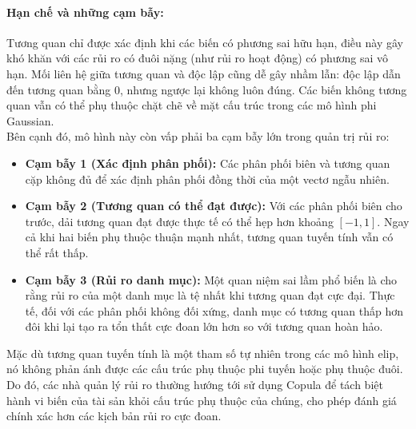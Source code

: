 \paragraph{Hạn chế và những cạm bẫy:}
Tương quan chỉ được xác định khi các biến có phương sai hữu hạn, điều này gây khó khăn với các rủi ro có đuôi nặng (như rủi ro hoạt động) có phương sai vô hạn. Mối liên hệ giữa tương quan và độc lập cũng dễ gây nhầm lẫn: độc lập dẫn đến tương quan bằng $0$, nhưng ngược lại không luôn đúng. Các biến không tương quan vẫn có thể phụ thuộc chặt chẽ về mặt cấu trúc trong các mô hình phi Gaussian.\\
Bên cạnh đó, mô hình này còn vấp phải ba cạm bẫy lớn trong quản trị rủi ro:
\begin{itemize}
    \item \textbf{Cạm bẫy 1 (Xác định phân phối):} Các phân phối biên và tương quan cặp không đủ để xác định phân phối đồng thời của một vectơ ngẫu nhiên.
    \item \textbf{Cạm bẫy 2 (Tương quan có thể đạt được):} Với các phân phối biên cho trước, dải tương quan đạt được thực tế có thể hẹp hơn khoảng $[-1, 1]$. Ngay cả khi hai biến phụ thuộc thuận mạnh nhất, tương quan tuyến tính vẫn có thể rất thấp.
    \item \textbf{Cạm bẫy 3 (Rủi ro danh mục):} Một quan niệm sai lầm phổ biến là cho rằng rủi ro của một danh mục là tệ nhất khi tương quan đạt cực đại. Thực tế, đối với các phân phối không đối xứng, danh mục có tương quan thấp hơn đôi khi lại tạo ra tổn thất cực đoan lớn hơn so với tương quan hoàn hảo.
\end{itemize}

\noindent Mặc dù tương quan tuyến tính là một tham số tự nhiên trong các mô hình elip, nó không phản ánh được các cấu trúc phụ thuộc phi tuyến hoặc phụ thuộc đuôi. Do đó, các nhà quản lý rủi ro thường hướng tới sử dụng Copula để tách biệt hành vi biến của tài sản khỏi cấu trúc phụ thuộc của chúng, cho phép đánh giá chính xác hơn các kịch bản rủi ro cực đoan.

